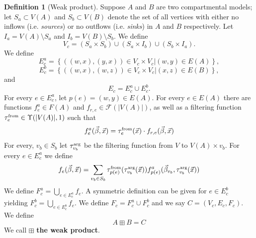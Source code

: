 \documentclass{article}
\theoremstyle{definition}
\newtheorem{definition}{Definition}
\newcommand{\abs}[1]{\lvert #1 \rvert}%
\newcommand{\betavec}{\vec{\beta}}
\newcommand{\xvec}{\vec{x}}
\newcommand{\fr}{\ensuremath{\mathcal F}}
\newcommand{\tauf}{\tau^{\mbox{\tiny from}}}
\newcommand{\taua}{\tau^{\mbox{\tiny arg}}}
\begin{document}
\begin{definition}[Weak product]
    Suppose $A$ and $B$ are two compartmental models; let $S_a\subset V(A)$ and $S_b\subset V(B)$ denote the set of all vertices with either no inflows (i.e. \emph{sources}) or no outflows (i.e. \emph{sinks}) in $A$ and $B$ respectively. Let $I_a=V(A)\setminus S_a$ and $I_b=V(B)\setminus S_b$. We define
    \begin{equation}
        V_c = (S_a\times S_b) \cup (S_a\times I_b) \cup (S_b\times I_a).
    \end{equation}
    We define
    \begin{equation}
        E_c^a = \left\{((w,x),(y,x))\in V_c\times V_c\vert (w,y)\in E(A) \right\},
    \end{equation}
    \begin{equation}
        E_c^b = \left\{((w,x),(w,z))\in V_c\times V_c\vert (x,z)\in E(B) \right\},
    \end{equation}
    and
    \begin{equation}
        E_c = E_c^a\cup E_c^b.
    \end{equation}
    For every $e\in E_c^a$, let $p(e) = (w,y)\in E(A)$. For every $e\in E(A)$ there are functions $f^a_{e}\in F(A)$ and $f_{r,e}\in \fr(\abs{V(A)})$, as well as a filtering function $\tauf_{e}\in\Upsilon(\abs{V(A)}, 1)$ such that
    \begin{equation}
        f^a_{e}(\betavec, \xvec) = \tauf_e(\xvec)\cdot f_{r,e}(\betavec, \xvec)
    \end{equation}
    For every, $v_b\in S_b$ let $\taua_{v_b}$ be the filtering function from $V$ to $V(A)\times v_b$. For every $e\in E_c^a$ we define
    \begin{equation}
        f_e(\betavec, \xvec) = \sum\limits_{v_b\in S_b}\tauf_{p(e)}(\taua_{v_b}(\xvec))f^a_{p(e)}(\betavec_{v_b}, \taua_{v_b}(\xvec))
    \end{equation}
    We define $F_c^a = \bigcup\limits_{e\in E_c^a}f_e$. A symmetric definition can be given for $e\in E_c^b$ yielding $F_c^b = \bigcup\limits_{e\in E_c^b}f_e$. We define $F_c = F_c^a\cup F_c^b$ and we say $C = (V_c, E_c, F_c)$. We define
    \begin{equation}
        A\boxplus B = C
    \end{equation} We call $\boxplus$ \textbf{the weak product}.
    
\end{definition}
\end{document}
